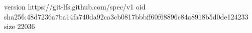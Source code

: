 version https://git-lfs.github.com/spec/v1
oid sha256:48d7236a7ba14fa740da92ca3cb0817bbbff60f68896c84a8918b5d0de124233
size 22036
